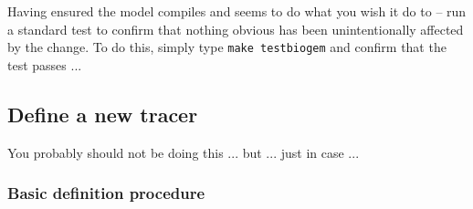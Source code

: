 \documentclass[10pt,twoside]{article}
\begin{document}
\noindent Having ensured the model compiles and seems to do what you wish it do to -- run a standard test to confirm that nothing obvious has been unintentionally affected by the change. To do this, simply type \texttt{make testbiogem} and confirm that the test passes ...


\subsection{Define a new tracer}\label{Define a new trace}

You probably should not be doing this ... but ... just in case ...


\subsubsection{Basic definition procedure}
\end{document}
